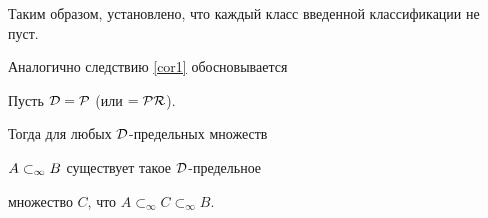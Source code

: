 




Таким образом, установлено, что каждый класс введенной классификации не пуст.





Аналогично следствию \ref{cor1} обосновывается





\begin{cor}


Пусть $\cal{D}=\cal{P}$ (или $=\cal{PR}$).


Тогда для любых $\cal{D}$-предельных множеств


${A}\subset_\infty{B}$ существует такое $\cal{D}$-предельное


множество $C$, что $A\subset_\infty C\subset_\infty B$.


\end{cor}





